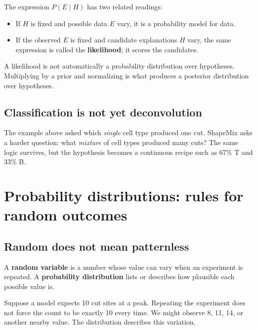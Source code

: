 \documentclass[11pt]{article}
\newcommand{\term}[1]{\textbf{\color{tealdark}#1}}
\begin{document}
The expression \(P(E\mid H)\) has two related readings:

\begin{itemize}[leftmargin=2em]
  \item If \(H\) is fixed and possible data \(E\) vary, it is a probability model for data.
  \item If the observed \(E\) is fixed and candidate explanations \(H\) vary, the same expression is called the \term{likelihood}; it scores the candidates.
\end{itemize}

\begin{watchout}
A likelihood is not automatically a probability distribution over hypotheses.
Multiplying by a prior and normalizing is what produces a posterior distribution
over hypotheses.
\end{watchout}

\subsection{Classification is not yet deconvolution}

The example above asked which \emph{single} cell type produced one cut.
ShapeMix asks a harder question: what \emph{mixture} of cell types produced many
cuts? The same logic survives, but the hypothesis becomes a continuous recipe
such as 67\% T and 33\% B.

\section{Probability distributions: rules for random outcomes}

\subsection{Random does not mean patternless}

A \term{random variable} is a number whose value can vary when an experiment is
repeated. A \term{probability distribution} lists or describes how plausible each
possible value is.

Suppose a model expects 10 cut sites at a peak. Repeating the experiment does not
force the count to be exactly 10 every time. We might observe 8, 11, 14, or another
nearby value. The distribution describes this variation.
\end{document}
